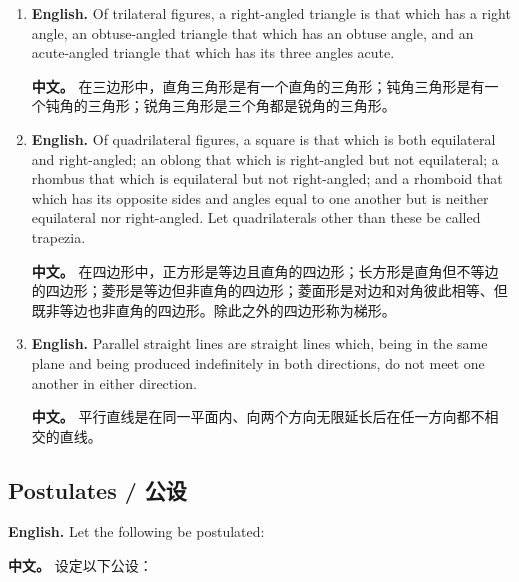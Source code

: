 \begin{enumerate}
\item \textbf{English.} Of trilateral figures, a right-angled triangle is that which has a right angle, an obtuse-angled triangle that which has an obtuse angle, and an acute-angled triangle that which has its three angles acute. \par\textbf{中文。} 在三边形中，直角三角形是有一个直角的三角形；钝角三角形是有一个钝角的三角形；锐角三角形是三个角都是锐角的三角形。
\item \textbf{English.} Of quadrilateral figures, a square is that which is both equilateral and right-angled; an oblong that which is right-angled but not equilateral; a rhombus that which is equilateral but not right-angled; and a rhomboid that which has its opposite sides and angles equal to one another but is neither equilateral nor right-angled. Let quadrilaterals other than these be called trapezia. \par\textbf{中文。} 在四边形中，正方形是等边且直角的四边形；长方形是直角但不等边的四边形；菱形是等边但非直角的四边形；菱面形是对边和对角彼此相等、但既非等边也非直角的四边形。除此之外的四边形称为梯形。
\item \textbf{English.} Parallel straight lines are straight lines which, being in the same plane and being produced indefinitely in both directions, do not meet one another in either direction. \par\textbf{中文。} 平行直线是在同一平面内、向两个方向无限延长后在任一方向都不相交的直线。
\end{enumerate}

\subsection*{Postulates / 公设}

\noindent\textbf{English.} Let the following be postulated:

\noindent\textbf{中文。} 设定以下公设：

